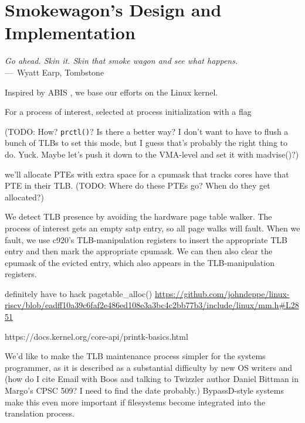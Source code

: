
\chapter{Smokewagon's Design and Implementation}
\label{ch:Implementation}

\begin{epigraph}
	\emph{Go ahead. Skin it. Skin that smoke wagon and see what happens.} \\
	---~Wyatt Earp, Tombstone
\end{epigraph}

Inspired by ABIS \cite{amit_optimizing_2017}, we base our efforts on the Linux kernel.

For a process of interest, selected at process initialization with a flag

(TODO: How? \verb+prctl()+? Is there a better way? I don't want to have to flush a bunch of TLBs to set this mode, but I guess that's probably the right thing to do. Yuck. Maybe let's push it down to the VMA-level and set it with madvise()?)

we'll allocate PTEs with extra space for a cpumask that tracks cores have that PTE in their TLB. (TODO: Where do these PTEs go? When do they get allocated?)

We detect TLB presence by avoiding the hardware page table walker. The process of interest gets an empty satp entry, so all page walks will fault. When we fault, we use c920's TLB-manipulation registers to insert the appropriate TLB entry and then mark the appropriate cpumask. We can then also clear the cpumask of the evicted entry, which also appears in the TLB-manipulation registers.

definitely have to hack {pagetable\_alloc()} \url{https://github.com/johndeppe/linux-riscv/blob/eadff10a39c6faf2e486ed108e3a3bc4c2bb77b3/include/linux/mm.h#L2851}

https://docs.kernel.org/core-api/printk-basics.html


We'd like to make the TLB maintenance process simpler for the systems programmer, as it is described as a substantial difficulty by new OS writers \cite{boos_theseus_2022} and (how do I cite Email with Boos and talking to Twizzler author Daniel Bittman in Margo's CPSC 509? I need to find the date probably.) BypassD-style systems \cite{yadalam_bypassd_2024} make this even more important if filesystems become integrated into the translation process.

